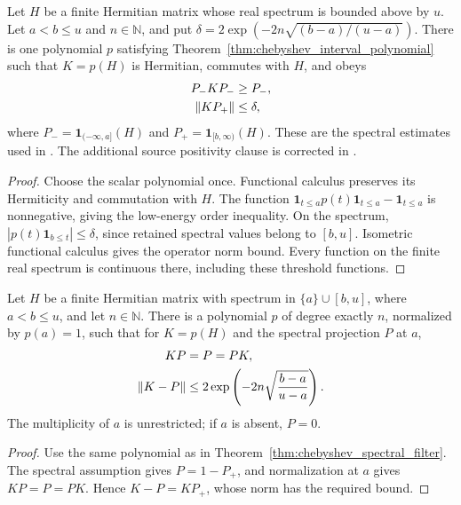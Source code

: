 \begin{theorem}
    \label{thm:chebyshev_spectral_filter}
    \leanok
    Let $H$ be a finite Hermitian matrix whose real spectrum is bounded above
    by $u$. Let $a<b\le u$ and $n\in\mathbb N$, and put
    $\delta=2\exp(-2n\sqrt{(b-a)/(u-a)})$.
    There is one polynomial $p$ satisfying
    Theorem~\ref{thm:chebyshev_interval_polynomial} such that $K=p(H)$
    is Hermitian, commutes with $H$, and obeys
    \begin{align}
        P_-KP_-  & \ge P_-,\notag   \\
        \|KP_+\| & \le\delta,\notag
    \end{align}
    where $P_-=\mathbf1_{(-\infty,a]}(H)$ and
    $P_+=\mathbf1_{[b,\infty)}(H)$.
    These are the spectral estimates used in
    \cite{Arad2013AreaLaw,Arad2016RigorousRG}. The additional source
    positivity clause is corrected in
    \cite{gap:alvv16_chebyshev_filter_positivity}.
\end{theorem}
\begin{proof}\leanok
    Choose the scalar polynomial once. Functional calculus preserves its
    Hermiticity and commutation with $H$.
    The function $\mathbf1_{t\le a}p(t)\mathbf1_{t\le a}-\mathbf1_{t\le a}$
    is nonnegative, giving the low-energy order inequality.
    On the spectrum, $|p(t)\mathbf1_{b\le t}|\le\delta$, since retained
    spectral values belong to $[b,u]$. Isometric functional calculus gives
    the operator norm bound. Every function on the finite real spectrum
    is continuous there, including these threshold functions.
\end{proof}

\begin{theorem}
    \label{thm:chebyshev_isolated_energy_projection}
    \leanok
    Let $H$ be a finite Hermitian matrix with spectrum in $\{a\}\cup[b,u]$,
    where $a<b\le u$, and let $n\in\mathbb N$.
    There is a polynomial $p$ of degree exactly $n$, normalized by $p(a)=1$,
    such that for $K=p(H)$ and the spectral projection $P$ at $a$,
    \begin{align}
        KP      & =P=PK,\notag                                          \\
        \|K-P\| & \le2\exp\left(-2n\sqrt{\frac{b-a}{u-a}}\right).\notag
    \end{align}
    The multiplicity of $a$ is unrestricted; if $a$ is absent, $P=0$.
\end{theorem}
\begin{proof}\leanok
    Use the same polynomial as in Theorem~\ref{thm:chebyshev_spectral_filter}.
    The spectral assumption gives $P=1-P_+$, and normalization at $a$
    gives $KP=P=PK$. Hence $K-P=KP_+$, whose norm has the required bound.
\end{proof}

